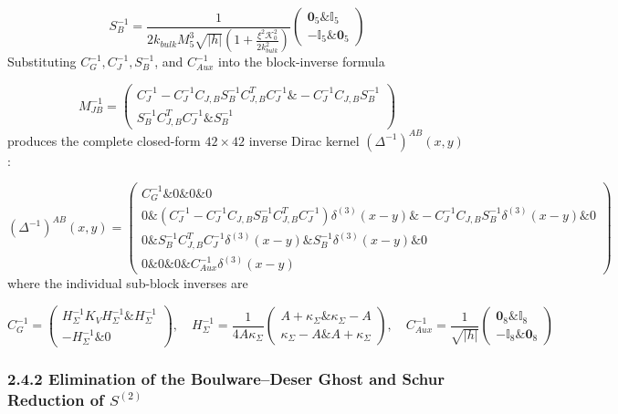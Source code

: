 \documentclass[aps,prd,onecolumn,superscriptaddress,nofootinbib,longbibliography,10pt]{revtex4-2}
\begin{document}
{{  \[ S_B^{-1} = \frac{1}{2k_{bulk}M_5^3\sqrt{|h|}\left(1 + \frac{\xi^2\mathcal{K}_0^2}{2k_{bulk}^2}\right)}\begin{pmatrix} \mathbf{0}_5 \& \mathbb{I}_5 \\ -\mathbb{I}_5 \& \mathbf{0}_5 \end{pmatrix} \]
  Substituting \(C_G^{-1}, C_J^{-1}, S_B^{-1}\), and \(C_{Aux}^{-1}\) into the block-inverse formula


  \[ M_{JB}^{-1} = \begin{pmatrix} C_J^{-1} - C_J^{-1}C_{J,B}S_B^{-1}C_{J,B}^T C_J^{-1} \& -C_J^{-1}C_{J,B}S_B^{-1} \\ S_B^{-1}C_{J,B}^T C_J^{-1} \& S_B^{-1} \end{pmatrix} \]
  produces the complete closed-form \(42 \times 42\) inverse Dirac kernel \((\Delta^{-1})^{AB}(x,y)\):


  \[ (\Delta^{-1})^{AB}(x,y) = \begin{pmatrix} C_G^{-1} \& 0 \& 0 \& 0 \\ 0 \& (C_J^{-1} - C_J^{-1}C_{J,B}S_B^{-1}C_{J,B}^T C_J^{-1})\delta^{(3)}(x-y) \& -C_J^{-1}C_{J,B}S_B^{-1}\delta^{(3)}(x-y) \& 0 \\ 0 \& S_B^{-1}C_{J,B}^T C_J^{-1}\delta^{(3)}(x-y) \& S_B^{-1}\delta^{(3)}(x-y) \& 0 \\ 0 \& 0 \& 0 \& C_{Aux}^{-1}\delta^{(3)}(x-y) \end{pmatrix} \]
  where the individual sub-block inverses are


  \[ C_G^{-1} = \begin{pmatrix} H_\Sigma^{-1}K_V H_\Sigma^{-1} \& H_\Sigma^{-1} \\ -H_\Sigma^{-1} \& 0 \end{pmatrix}, \quad H_\Sigma^{-1} = \frac{1}{4A\kappa_\Sigma}\begin{pmatrix} A + \kappa_\Sigma \& \kappa_\Sigma - A \\ \kappa_\Sigma - A \& A + \kappa_\Sigma \end{pmatrix}, \quad C_{Aux}^{-1} = \frac{1}{\sqrt{|h|}}\begin{pmatrix} \mathbf{0}_8 \& \mathbb{I}_8 \\ -\mathbb{I}_8 \& \mathbf{0}_8 \end{pmatrix} \]

  
\subsubsection*{2.4.2 Elimination of the Boulware–Deser Ghost and Schur Reduction of \(S^{(2)}\)}

}}
\end{document}
